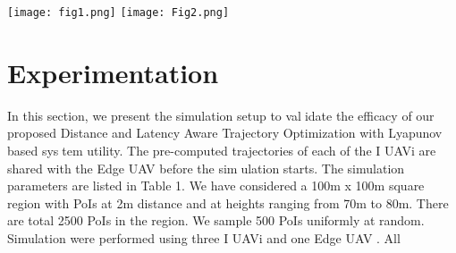\documentclass{article}
\begin{document}
\begin{multicols}{2}
\texttt{[image: fig1.png]}
\texttt{[image: Fig2.png]}

\section{Experimentation}
In this section, we present the simulation setup to validate the efficacy of our proposed Distance and Latency
Aware Trajectory Optimization with Lyapunov based system utility. The pre-computed trajectories of each of the
I UAVi are shared with the Edge UAV before the simulation starts. The simulation parameters are listed in
Table 1.
We have considered a 100m x 100m square region with
PoIs at 2m distance and at heights ranging from 70m
to 80m. There are total 2500 PoIs in the region. We
sample 500 PoIs uniformly at random. Simulation were
performed using three I UAVi and one Edge UAV . All


















\end{multicols}
\end{document}
